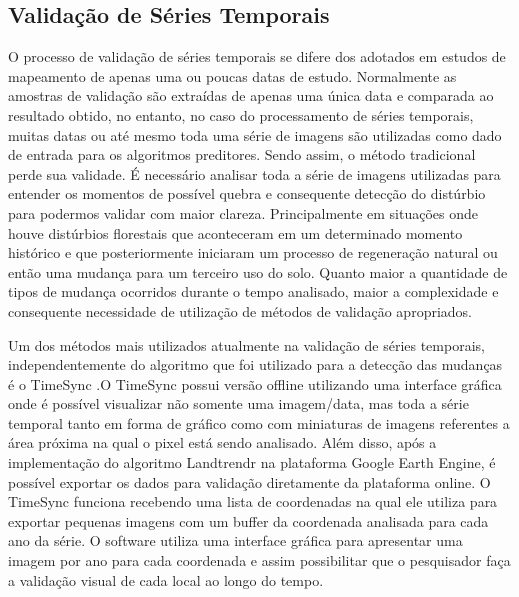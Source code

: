 \documentclass[12pt,a4paper]{article}
\begin{document}
\subsection{Validação de Séries Temporais}
\hspace{13pt} O processo de validação de séries temporais se difere dos adotados em estudos de mapeamento de apenas uma ou poucas datas de estudo. Normalmente as amostras de validação são extraídas de apenas uma única data e comparada ao resultado obtido, no entanto, no caso do processamento de séries temporais, muitas datas ou até mesmo toda uma série de imagens são utilizadas como dado de entrada para os algoritmos preditores. Sendo assim, o método tradicional perde sua validade. É necessário analisar toda a série de imagens utilizadas para entender os momentos de possível quebra e consequente detecção do distúrbio para podermos validar com maior clareza. Principalmente em situações onde houve distúrbios florestais que aconteceram em um determinado momento histórico e que posteriormente iniciaram um processo de regeneração natural ou então uma mudança para um terceiro uso do solo. Quanto maior a quantidade de tipos de mudança ocorridos durante o tempo analisado, maior a complexidade e consequente necessidade de utilização de métodos de validação apropriados.

Um dos métodos mais utilizados atualmente na validação de séries temporais, independentemente do algoritmo que foi utilizado para a detecção das mudanças é o TimeSync \citep{COHEN20102911}.O TimeSync possui versão offline utilizando uma interface gráfica onde é possível visualizar não somente uma imagem/data, mas toda a série temporal tanto em forma de gráfico como com miniaturas de imagens referentes a área próxima na qual o pixel está sendo analisado. Além disso, após a implementação do algoritmo Landtrendr na plataforma Google Earth Engine, é possível exportar os dados para validação diretamente da plataforma online.  O TimeSync funciona recebendo uma lista de coordenadas na qual ele utiliza para exportar pequenas imagens com um buffer da coordenada analisada para cada ano da série. O software utiliza uma interface gráfica para apresentar uma imagem por ano para cada coordenada e assim possibilitar que o pesquisador faça a validação visual de cada local ao longo do tempo. 
\end{document}
